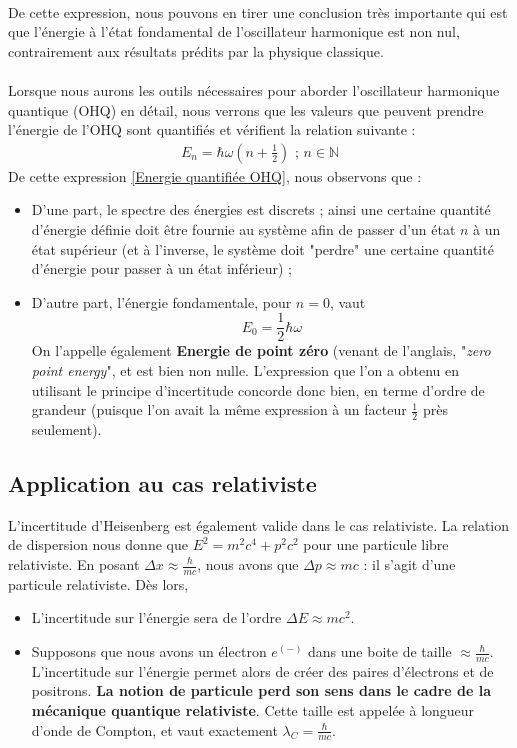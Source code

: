 \documentclass[../Notes de cours]{subfiles}
\begin{document}
\paragraph{} De cette expression, nous pouvons en tirer une conclusion très importante qui est que l'énergie à l'état fondamental de l'oscillateur harmonique est non nul, contrairement aux résultats prédits par la physique classique. 

\paragraph{} Lorsque nous aurons les outils nécessaires pour aborder l'oscillateur harmonique quantique (OHQ) en détail, nous verrons que les valeurs que peuvent prendre l'énergie de l'OHQ sont quantifiés et vérifient la relation suivante :
\begin{align}
\label{Energie quantifiée OHQ}
E_n = \hbar \omega \left( n + \frac{1}{2} \right) \mbox{ ; $n \in \mathbb{N} $}
\end{align}
De cette expression \ref{Energie quantifiée OHQ}, nous observons que : 
\begin{itemize}[label=\textbullet]
    \item D'une part, le spectre des énergies est discrets ; ainsi une certaine quantité d'énergie définie doit être fournie au système afin de passer d'un état $n$ à un état supérieur (et à l'inverse, le système doit "perdre" une certaine quantité d'énergie pour passer à un état inférieur) ; 
    \item D'autre part, l'énergie fondamentale, pour $n=0$, vaut $$ E_0 = \frac{1}{2} \hbar \omega $$
    On l'appelle également \textbf{Energie de point zéro} (venant de l'anglais, "\textit{zero point energy}", et est bien non nulle. 
    \newline L'expression que l'on a obtenu en utilisant le principe d'incertitude concorde donc bien, en terme d'ordre de grandeur (puisque l'on avait la même expression à un facteur $\frac{1}{2}$ près seulement). 
\end{itemize} 

\subsection{Application au cas relativiste}
L'incertitude d'Heisenberg est également valide dans le cas relativiste. La relation de dispersion nous donne que $E^2 = m^2 c^4 + p^2 c^2$ pour une particule libre relativiste. En posant $\Delta x \approx \frac{\hbar}{mc}$, nous avons que $\Delta p \approx mc$ : il s'agit d'une particule relativiste. Dès lors,
\begin{itemize}
\item L'incertitude sur l'énergie sera de l'ordre $\Delta E \approx mc^2$.
\item Supposons que nous avons un électron $e^(-)$ dans une boite de taille $\approx \frac{\hbar}{mc}$. L'incertitude sur l'énergie permet alors de créer des paires d'électrons et de positrons. \textbf{La notion de particule perd son sens dans le cadre de la mécanique quantique relativiste}. Cette taille est appelée à longueur d'onde de Compton, et vaut exactement $\lambda_C = \frac{\hbar}{mc}$.
\end{itemize}
\end{document}
